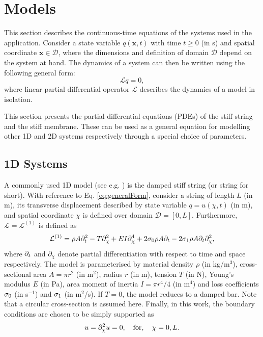\documentclass{article}
\begin{document}
\section{Models}\label{sec:models}
This section describes the continuous-time equations of the systems used in the application. Consider a state variable $q(\boldsymbol{x}, t)$ with time $t\geq 0$ (in s) and spatial coordinate $\boldsymbol{x}\in \mathcal{D}$, where the dimensions and definition of domain $\mathcal{D}$ depend on the system at hand. The dynamics of a system can then be written using the following general form:
\begin{equation}\label{eq:generalForm}
    \mathcal{L}q = 0,
\end{equation}
where linear partial differential operator $\mathcal{L}$ describes the dynamics of a model in isolation.

This section presents the partial differential equations (PDEs) of the stiff string and the stiff membrane. These can be used as a general equation for modelling other 1D and 2D systems respectively through a special choice of parameters. 


\subsection{1D Systems}
A commonly used 1D model (see e.g. \cite{Willemsen2019, Bilbao2019}) is the damped stiff string (or string for short). With reference to Eq. \eqref{eq:generalForm}, consider a string of length $L$ (in m), its transverse displacement described by state variable $q = u(\chi, t)$ (in m), and spatial coordinate $\chi$ is defined over domain $\mathcal{D} = [0, L]$. Furthermore, $\mathcal{L}=\mathcal{L}^{(\text{1})}$ is defined as \cite{Bensa2003}
\begin{equation}\label{eq:stiffString}
    \mathcal{L}^{(1)}= \rho A\partial_t^2 - T\partial_{\chi}^2 + E I \partial_{\chi}^4 + 2\sigma_{0}\rho A\partial_t - 2 \sigma_{1}\rho A\partial_t\partial_{\chi}^2,
\end{equation}
where $\partial_t$ and $\partial_\chi$ denote partial differentiation with respect to time and space respectively. The model is parameterised by material density $\rho$ (in kg/m$^3$), cross-sectional area $A = \pi r^2$ (in m$^2$), radius $r$ (in m), tension $T$ (in N), Young's modulus $E$ (in Pa), area moment of inertia $I = \pi r^4/4$ (in m$^4$) and loss coefficients $\sigma_{0}$ (in s$^{-1}$) and $\sigma_{1}$ (in m$^2$/s). If $T=0$, the model reduces to a damped bar. Note that a circular cross-section is assumed here. Finally, in this work, the boundary conditions are chosen to be simply supported as
\begin{equation}
    u = \partial_{\chi}^2 u = 0, \quad \text{for}, \quad \chi = 0, L.
\end{equation}
\end{document}
